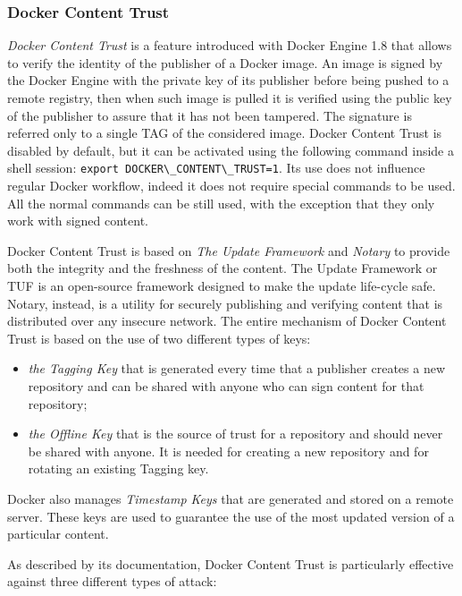 \documentclass[a4paper,12pt]{article}
\newcommand{\code}[1]{\lstinline|#1|}
\begin{document}
\subsubsection{Docker Content Trust}

\textit{Docker Content Trust} \cite{docker_content_trust} is a feature
introduced with Docker Engine 1.8 that allows to verify the identity of the
publisher of a Docker image. An image is signed by the Docker Engine with the
private key of its publisher before being pushed to a remote registry, then when
such image is pulled it is verified using the public key of the publisher to
assure that it has not been tampered. The signature is referred only to a single
TAG of the considered image. Docker Content Trust is disabled by default, but it
can be activated using the following command inside a shell session:
\code{export DOCKER\_CONTENT\_TRUST=1}. Its use does not influence regular
Docker workflow, indeed it does not require special commands to be used. All the
normal commands can be still used, with the exception that they only work with
signed content. \par Docker Content Trust is based on \textit{The Update
Framework} and \textit{Notary} to provide both the integrity and the freshness
of the content. The Update Framework or TUF is an open-source framework designed
to make the update life-cycle safe. Notary, instead, is a utility for securely
publishing and verifying content that is distributed over any insecure network.
The entire mechanism of Docker Content Trust is based on the use of two
different types of keys: 
\begin{itemize}
  \item \textit{the Tagging Key} that is generated every time that a publisher
  creates a new repository and can be shared with anyone who can sign content
  for that repository;
  \item \textit{the Offline Key} that is the source of trust for a repository
  and should never be shared with anyone. It is needed for creating a new
  repository and for rotating an existing Tagging key. 
\end{itemize}
Docker also manages \textit{Timestamp Keys} that are generated and stored on a remote
server. These keys are used to guarantee the use of the most updated version of
a particular content. \par As described by its documentation, Docker Content
Trust is particularly effective against three different types of attack:
\end{document}
